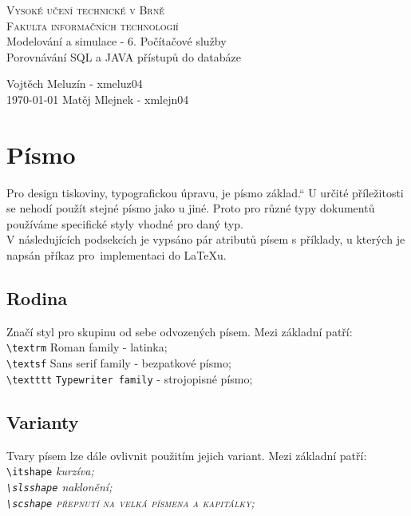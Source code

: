 \documentclass[a4paper, 11pt]{article}
\providecommand{\uv}[1]{\quotedblbase #1\textquotedblleft}
\begin{document}
\thispagestyle{empty}
\begin{center}
\Huge
\textsc{Vysoké učení technické v Brně}\\
\huge
\textsc{Fakulta informačních technologií}\\
\LARGE
{}
Modelování a simulace - 6. Počítačové služby\\ \Huge Porovnávání SQL a JAVA přístupů do databáze
\end{center}

{
\LARGE \hfill
Vojtěch Meluzín - xmeluz04\\
\today \hfill
Matěj Mlejnek - xmlejn04}

\newpage
\thispagestyle{empty}

\tableofcontents

\newpage
\setcounter{page}{1}
\section{Písmo}
\uv{Pro design tiskoviny, typografickou úpravu, je písmo základ.} \cite{jak_publikovat_napocitaci}
U určité příležitosti se nehodí použít stejné písmo jako u jiné. Proto pro různé typy 
dokumentů používáme specifické styly vhodné pro daný typ. \cite{dipl_martin_cerny, typografia_cz}\\ 
V následujících podsekcích je vypsáno pár atributů písem s příklady, u kterých je napsán příkaz pro~implementaci do \LaTeX u. 
\subsection{Rodina}
Značí styl pro skupinu od sebe odvozených písem. Mezi základní patří: \\ 
\verb|\textrm| \hspace{0.5cm} \textrm{Roman family} - latinka;\\
\verb|\textsf| \hspace{0.5cm} \textsf{Sans serif family} - bezpatkové písmo;\\
\verb|\textttt| \hspace{0.3cm} \texttt{Typewriter family} - strojopisné písmo;
\cite{latex_kompletni_pruvodce, typograficky_manual}

\newpage

\subsection{Varianty}
Tvary písem lze dále ovlivnit použitím jejich variant. Mezi základní patří: \\
\verb|\itshape| \hspace{0.5cm} \itshape{kurzíva;} \\
\verb|\slsshape| \hspace{0.28cm} \slshape{naklonění;} \\
\verb|\scshape| \hspace{0.5cm} \scshape přepnutí na velká písmena a kapitálky; \normalfont
\cite{latex_kompletni_pruvodce, typograficky_manual}
\end{document}
